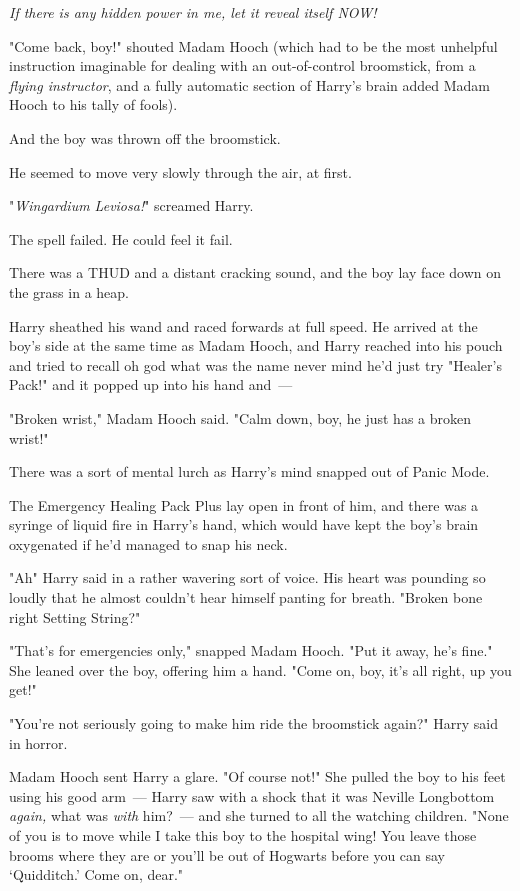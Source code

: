 \emph{If there is any hidden power in me, let it reveal itself NOW!}

"Come back, boy!" shouted Madam Hooch (which had to be the most unhelpful
instruction imaginable for dealing with an out-of-control broomstick, from a
\emph{flying instructor}, and a fully automatic section of Harry's brain added
Madam Hooch to his tally of fools).

And the boy was thrown off the broomstick.

He seemed to move very slowly through the air, at first.

"\emph{Wingardium Leviosa!}" screamed Harry.

The spell failed. He could feel it fail.

There was a THUD and a distant cracking sound, and the boy lay face down on the
grass in a heap.

Harry sheathed his wand and raced forwards at full speed. He arrived at the
boy's side at the same time as Madam Hooch, and Harry reached into his pouch
and tried to recall oh god what was the name never mind he'd just try "Healer's
Pack!" and it popped up into his hand and~---

"Broken wrist," Madam Hooch said. "Calm down, boy, he just has a broken wrist!"

There was a sort of mental lurch as Harry's mind snapped out of Panic Mode.

The Emergency Healing Pack Plus lay open in front of him, and there was a
syringe of liquid fire in Harry's hand, which would have kept the boy's brain
oxygenated if he'd managed to snap his neck.

"Ah{\el}" Harry said in a rather wavering sort of voice. His heart was
pounding so loudly that he almost couldn't hear himself panting for breath.
"Broken bone{\el} right{\el} Setting String?"

"That's for emergencies only," snapped Madam Hooch. "Put it away, he's fine."
She leaned over the boy, offering him a hand. "Come on, boy, it's all right, up
you get!"

"You're not seriously going to make him ride the broomstick again?" Harry said
in horror.

Madam Hooch sent Harry a glare. "Of course not!" She pulled the boy to his feet
using his good arm~--- Harry saw with a shock that it was Neville Longbottom
\emph{again,} what was \emph{with} him?~--- and she turned to all the watching
children. "None of you is to move while I take this boy to the hospital wing!
You leave those brooms where they are or you'll be out of Hogwarts before you
can say `Quidditch.' Come on, dear."

